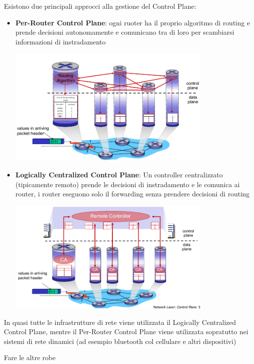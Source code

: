 Esistono due principali approcci alla gestione del Control Plane:

\begin{itemize}
    \item \textbf{Per-Router Control Plane}: ogni ruoter ha il proprio algoritmo di routing e prende decisioni autonomamente e comunicano tra di loro per scambiarsi informazioni di instradamento
    \begin{center}
        \includegraphics[width=10cm]{img/pre-router_control_plane.png}
    \end{center}
    \item \textbf{Logically Centralized Control Plane}: Un controller centralizzato (tipicamente remoto) prende le decisioni di instradamento e le comunica ai router, i router eseguono solo il forwarding senza prendere decisioni di routing
    \begin{center}
        \includegraphics[width=10cm]{img/centralized_control_plane.png}
    \end{center}
\end{itemize}

In quasi tutte le infrastrutture di rete viene utilizzata il Logically Centralized Control Plane, mentre il Per-Router Control Plane viene utilizzata sopratutto nei sistemi di rete dinamici (ad esempio bluetooth col cellulare e altri dispositivi)

Fare le altre robe

